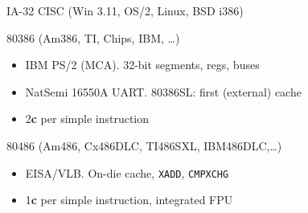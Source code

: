 \documentclass[xcolor={dvipsnames,table}]{beamer}
\begin{document}
\begin{frame}[t]{IA-32 CISC (Win 3.11, OS/2, Linux, BSD i386)}
\begin{block}{80386 (Am386, TI, Chips, IBM, \ldots)}
\begin{itemize}
\item IBM PS/2 (MCA). 32-bit segments, regs, buses
\item NatSemi 16550A UART. 80386SL: first (external) cache
\item 2\textbf{c} per simple instruction
\end{itemize}
\end{block}
\begin{block}{80486 (Am486, Cx486DLC, TI486SXL, IBM486DLC,\ldots)}
\begin{itemize}
\item EISA/VLB. On-die cache, \texttt{XADD}, \texttt{CMPXCHG}
\item 1\textbf{c} per simple instruction, integrated FPU
\end{itemize}
\end{block}
\vfill
\begin{center}
\end{center}
\end{frame}
\end{document}
